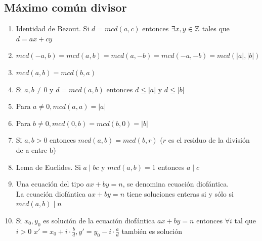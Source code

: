 \subsection{Máximo común divisor}
\begin{enunciado}\label{enun:propMcd}\leavevmode\par
\begin{enumerate}[label=\roman*)]
\item Identidad de Bezout. Si $d = mcd(a,c)$ entonces  $\exists x,y \in \mathbb{Z}$ tales que $d = ax + cy$  
\item $mcd(-a,b) = mcd(a,b) = mcd(a,-b) = mcd(-a,-b) = mcd(|a|,|b|)$ 
\item $mcd(a,b) = mcd(b,a)$
\item Si $a,b \neq 0$ y $d = mcd(a,b)$ entonces $d \leq |a|$ y $d \leq |b|$
\item Para $a \neq 0, mcd(a,a) = |a|$
\item Para $b \neq 0, mcd(0,b) = mcd(b,0) = |b|$
\item Si $a,b > 0$ entonces $mcd(a,b) = mcd(b,r)$ \; \; ($r$ es el residuo de la división de a entre b) 
\item Lema de Euclides. Si $a \mid bc$ y $mcd(a,b) = 1$ entonces $a \mid c$
\item Una ecuación del tipo $ax + by = n$, se denomina ecuación diofántica. \\
La ecuación diofántica $ax + by = n$ tiene soluciones enteras
si y sólo si $mcd(a,b) \mid n$ 
\item Si $x_0,y_0$ es solución de la ecuación diofántica $ax + by = n$ entonces $\forall i$ tal que $i > 0$ $x' = x_0 + i \cdot \frac{b}{d}, y' = y_0 - i \cdot \frac{a}{d}$ también es solución
\end{enumerate} \end{enunciado}

